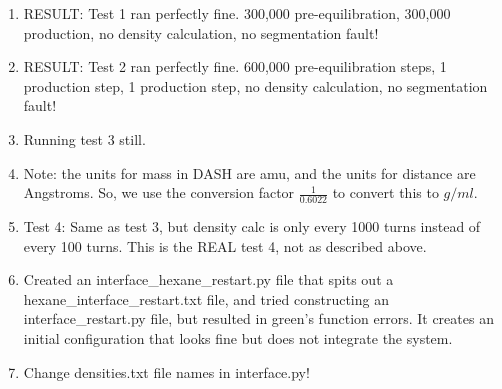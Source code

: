 \documentclass[12pt,reqno]{amsart}
\numberwithin{equation}{section}
\begin{document}
\begin{enumerate}
\item RESULT: Test 1 ran perfectly fine.  300,000 pre-equilibration, 300,000 production, no density calculation, no segmentation fault!  
\item RESULT: Test 2 ran perfectly fine.  600,000 pre-equilibration steps, 1 production step, 1 production step, no density calculation, no segmentation fault!
\item Running test 3 still.  

\item Note: the units for mass in DASH are amu, and the units for distance are Angstroms.  So, we use the conversion factor $\frac{1}{0.6022}$ to convert this to $g/ml$.  

\item Test 4: Same as test 3, but density calc is only every 1000 turns instead of every 100 turns.  This is the REAL test 4, not as described above.    

\item Created an interface\_hexane\_restart.py file that spits out a hexane\_interface\_restart.txt file, and tried constructing an interface\_restart.py file, but resulted in green's function errors.  It creates an initial configuration that looks fine but does not integrate the system.  

 
\item Change densities.txt file names in interface.py!  
\end{enumerate}
\end{document}
